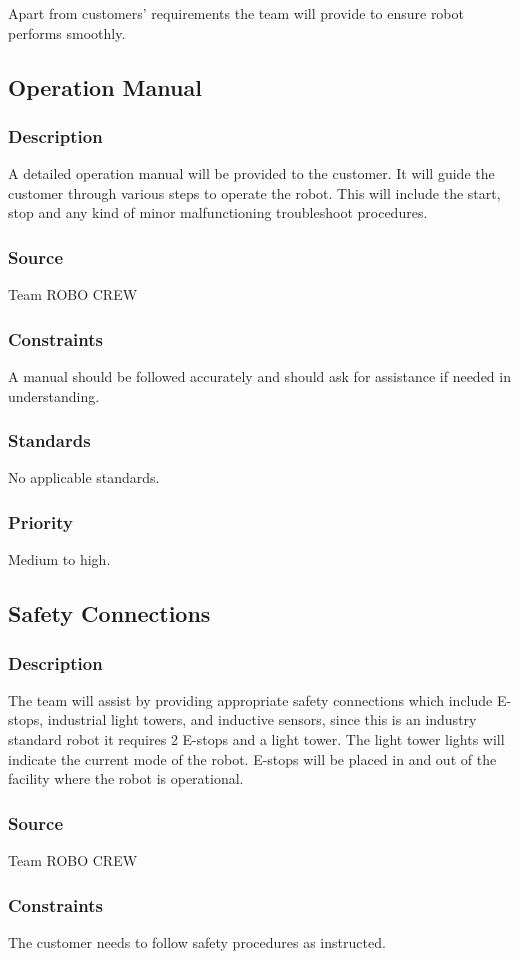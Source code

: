 Apart from customers' requirements the team will provide to ensure robot performs smoothly. 
\subsection{Operation Manual}
\subsubsection{Description}
A detailed operation manual will be provided to the customer. It will guide the customer through various steps to operate the robot. This will include the start, stop and any kind of minor malfunctioning troubleshoot procedures.  
\subsubsection{Source}
Team ROBO CREW 
\subsubsection{Constraints}
A manual should be followed accurately and should ask for assistance if needed in understanding. \subsubsection{Standards}
No applicable standards. 
\subsubsection{Priority}
Medium to high.

\subsection{Safety Connections}
\subsubsection{Description}
The team will assist by providing appropriate safety connections which include E-stops, industrial light towers, and inductive sensors, since this is an industry standard robot it requires 2 E-stops and a light tower. The light tower lights will indicate the current mode of the robot. E-stops will be placed in and out of the facility where the robot is operational. 
\subsubsection{Source}
Team ROBO CREW 
\subsubsection{Constraints}
The customer needs to follow safety procedures as instructed. 
